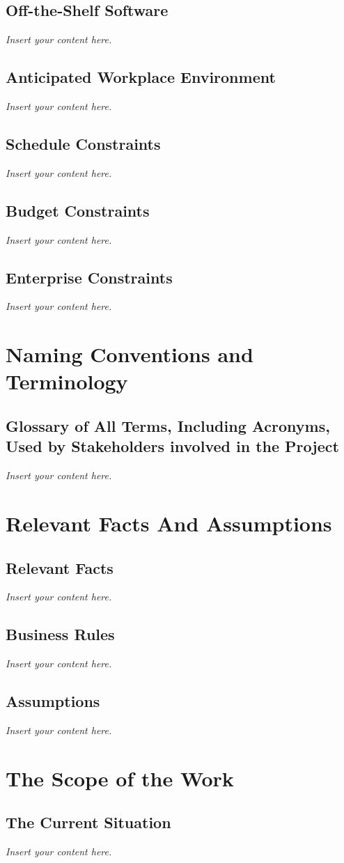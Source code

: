 \documentclass[12pt]{article}
\newcommand{\lips}{\textit{Insert your content here.}}
\begin{document}
\subsection{Off-the-Shelf Software}
\lips
\subsection{Anticipated Workplace Environment}
\lips
\subsection{Schedule Constraints}
\lips
\subsection{Budget Constraints}
\lips
\subsection{Enterprise Constraints}
\lips

\section{Naming Conventions and Terminology}
\subsection{Glossary of All Terms, Including Acronyms, Used by Stakeholders
involved in the Project}
\lips

\section{Relevant Facts And Assumptions}
\subsection{Relevant Facts}
\lips
\subsection{Business Rules}
\lips
\subsection{Assumptions}
\lips

\section{The Scope of the Work}
\subsection{The Current Situation}
\lips
\end{document}
